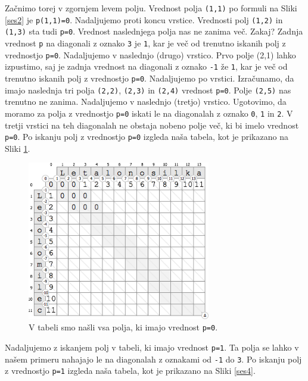 \documentclass[a4paper, 12pt, twoside]{book}
\begin{document}
Začnimo torej v zgornjem levem polju. Vrednost polja {\tt (1,1)} po formuli na Sliki \ref{ses2} je {\tt p(1,1)=0}. Nadaljujemo proti koncu vrstice. Vrednosti polj {\tt (1,2)} in {\tt (1,3)} sta tudi {\tt p=0}. Vrednost naslednjega polja nas ne zanima več. Zakaj? Zadnja vrednost {\tt p} na diagonali z oznako {\tt 3} je {\tt 1}, kar je več od trenutno iskanih polj z vrednostjo {\tt p=0}. Nadaljujemo v naslednjo (drugo) vrstico. Prvo polje (2,1) lahko izpustimo, saj je zadnja vrednost na diagonali z oznako {\tt -1} že {\tt 1}, kar je več od trenutno iskanih polj z vrednostjo {\tt p=0}. Nadaljujemo po vrstici. Izračunamo, da imajo naslednja tri polja {\tt (2,2)}, {\tt (2,3)} in {\tt (2,4)} vrednost {\tt p=0}. Polje {\tt (2,5)} nas trenutno ne zanima. Nadaljujemo v naslednjo (tretjo) vrstico. Ugotovimo, da moramo za polja z vrednostjo {\tt p=0} iskati le na diagonalah z oznako {\tt 0}, {\tt 1} in {\tt 2}. V tretji vrstici na teh diagonalah ne obstaja nobeno polje več, ki bi imelo vrednost {\tt p=0}. Po iskanju polj z vrednostjo {\tt p=0} izgleda naša tabela, kot je prikazano na Sliki \ref{ses3}.

\begin{figure}[placement h]
\begin{center}
\includegraphics[width=8cm]{ses3.png}
\end{center}
\caption{V tabeli smo našli vsa polja, ki imajo vrednost {\tt p=0}.}
\label{ses3}
\end{figure}

\pagebreak

Nadaljujemo z iskanjem polj v tabeli, ki imajo vrednost {\tt p=1}. Ta polja se lahko v našem primeru nahajajo le na diagonalah z oznakami od {\tt -1} do {\tt 3}. Po iskanju polj z vrednostjo {\tt p=1} izgleda naša tabela, kot je prikazano na Sliki \ref{ses4}.
\end{document}

